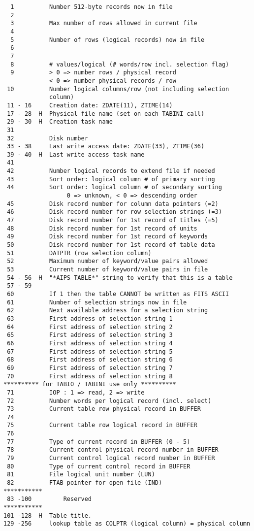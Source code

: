 \begin{verbatim}
  1          Number 512-byte records now in file
  2
  3          Max number of rows allowed in current file
  4
  5          Number of rows (logical records) now in file
  6
  7
  8          # values/logical (# words/row incl. selection flag)
  9          > 0 => number rows / physical record
             < 0 => number physical records / row
 10          Number logical columns/row (not including selection
             column)
 11 - 16     Creation date: ZDATE(11), ZTIME(14)
 17 - 28  H  Physical file name (set on each TABINI call)
 29 - 30  H  Creation task name
 31
 32          Disk number
 33 - 38     Last write access date: ZDATE(33), ZTIME(36)
 39 - 40  H  Last write access task name
 41
 42          Number logical records to extend file if needed
 43          Sort order: logical column # of primary sorting
 44          Sort order: logical column # of secondary sorting
                  0 => unknown, < 0 => descending order
 45          Disk record number for column data pointers (=2)
 46          Disk record number for row selection strings (=3)
 47          Disk record number for 1st record of titles (=5)
 48          Disk record number for 1st record of units
 49          Disk record number for 1st record of keywords
 50          Disk record number for 1st record of table data
 51          DATPTR (row selection column)
 52          Maximum number of keyword/value pairs allowed
 53          Current number of keyword/value pairs in file
 54 - 56  H  "*AIPS TABLE*" string to verify that this is a table
 57 - 59
 60          If 1 then the table CANNOT be written as FITS ASCII
 61          Number of selection strings now in file
 62          Next available address for a selection string
 63          First address of selection string 1
 64          First address of selection string 2
 65          First address of selection string 3
 66          First address of selection string 4
 67          First address of selection string 5
 68          First address of selection string 6
 69          First address of selection string 7
 70          First address of selection string 8
********** for TABIO / TABINI use only **********
 71          IOP : 1 => read, 2 => write
 72          Number words per logical record (incl. select)
 73          Current table row physical record in BUFFER
 74
 75          Current table row logical record in BUFFER
 76
 77          Type of current record in BUFFER (0 - 5)
 78          Current control physical record number in BUFFER
 79          Current control logical record number in BUFFER
 80          Type of current control record in BUFFER
 81          File logical unit number (LUN)
 82          FTAB pointer for open file (IND)
***********
 83 -100         Reserved
***********
101 -128  H  Table title.
129 -256     lookup table as COLPTR (logical column) = physical column
\end{verbatim}

